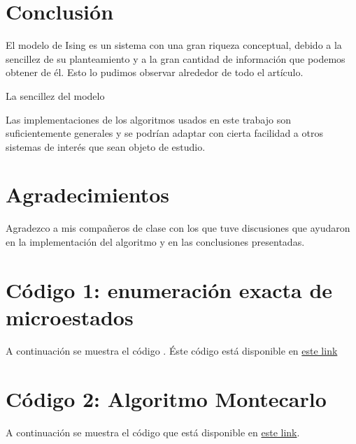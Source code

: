 \documentclass[%
 reprint,
 amsmath,amssymb,
 aps,
 pra,
]{revtex4-2}
\begin{document}
\section{Conclusión\label{sec:conclusion}}

El modelo de Ising es un sistema con una gran riqueza conceptual, debido a la sencillez de su planteamiento y a la gran cantidad de información que podemos obtener de él. Esto lo pudimos observar alrededor de todo el artículo. 

La sencillez del modelo  

Las implementaciones de los algoritmos usados en este trabajo son suficientemente generales y se podrían adaptar con cierta facilidad a otros sistemas de interés que sean objeto de estudio.

\section*{Agradecimientos}
Agradezco a mis compañeros de clase con los que tuve discusiones que ayudaron en la implementación del algoritmo y en las conclusiones presentadas.

\nocite{*}




\newpage


\appendix

\begin{widetext}

\section{Código 1: enumeración exacta de microestados\label{appx:microestados}}

A continuación se muestra el código . Éste código está disponible en \href{https://github.com/jearistiz/Statistical-Physics-Projects/blob/master/2/matrix_squaring.py}{este link}


\section{Código 2: Algoritmo Montecarlo\label{appx:montecarlo}}

A continuación se muestra el código que está disponible en \href{https://github.com/jearistiz/Statistical-Physics-Projects/blob/master/2/path_integral_naive_sampling.py}{este link}.


\end{widetext}
\end{document}
